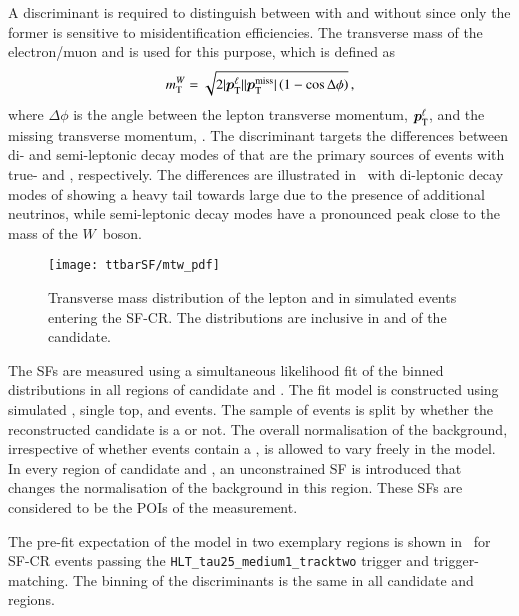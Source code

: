 A discriminant is required to distinguish between \ttbar with and without
\faketauhadvis since only the former is sensitive to \jettotauhadvis
misidentification efficiencies. The transverse mass of the electron/muon and
\pTmissAbs is used for this purpose, which is defined as
\begin{align*}
  m_{\text{T}}^W = \sqrt{2 | \bm{p}_{\text{T}}^{\ell} | | \bm{p}_{\text{T}}^{\text{miss}} | \left( 1 - \cos \Delta\phi \right)} \,\text{,}
\end{align*}
where $\Delta \phi$ is the angle between the lepton transverse momentum,
$\bm{p}_{\text{T}}^{\ell}$, and the missing transverse momentum, \pTmiss. The
\mTW discriminant targets the differences between di- and semi-leptonic decay
modes of \ttbar that are the primary sources of events with true- and
\faketauhadvis, respectively. The differences are illustrated
in~ with di-leptonic decay modes of \ttbar showing a
heavy tail towards large \mTW due to the presence of additional neutrinos, while
semi-leptonic decay modes have a pronounced peak close to the mass of the
$W$~boson.


\begin{figure}[htbp]
  \centering

  \texttt{[image: ttbarSF/mtw\_pdf]}

  \caption{Transverse mass distribution of the lepton and \pTmiss in simulated
    \ttbar events entering the SF-CR. The distributions are inclusive in \pT and
    \Ntracks of the \tauhadvis candidate.}%
  \label{fig:ttbarsf_mtw_pdf}
\end{figure}

The \faketauhadvis SFs are measured using a simultaneous likelihood fit of the
binned \mTW distributions in all regions of \tauhadvis candidate \pT and
\Ntracks. The fit model is constructed using simulated \ttbar, single top, and
\Vjets events. The sample of \ttbar events is split by whether the reconstructed
\tauhadvis candidate is a \faketauhadvis or not. The overall normalisation of
the \ttbar background, irrespective of whether events contain a \faketauhadvis,
is allowed to vary freely in the model.  In every region of \tauhadvis candidate
\Ntracks and \pT, an unconstrained SF is introduced that changes the
normalisation of the \ttbarFakes background in this region. These \faketauhadvis
SFs are considered to be the POIs of the measurement.

The pre-fit expectation of the model in two exemplary regions is shown
in~ for SF-CR events passing the
\verb|HLT_tau25_medium1_tracktwo| trigger and trigger-matching. The binning of
the \mTW discriminants is the same in all \tauhadvis candidate \pT and \Ntracks
regions.

